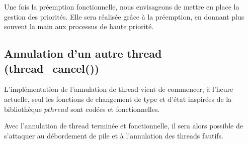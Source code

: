 Une fois la préemption fonctionnelle, nous envisageons de mettre en place la gestion des priorités. Elle sera réalisée grâce à la préemption, en donnant plus souvent la main aux processus de haute priorité.
 
\subsection{Annulation d'un autre thread (thread\_cancel())}
L'implémentation de l'annulation de thread vient de commencer, à l'heure actuelle, seul les fonctions de changement de type et d'état inspirées de la bibliothèque $pthread$ sont codées et fonctionnelles.

Avec l'annulation de thread terminée et fonctionnelle, il sera alors possible de s'attaquer au débordement de pile et à l'annulation des threads fautifs.
